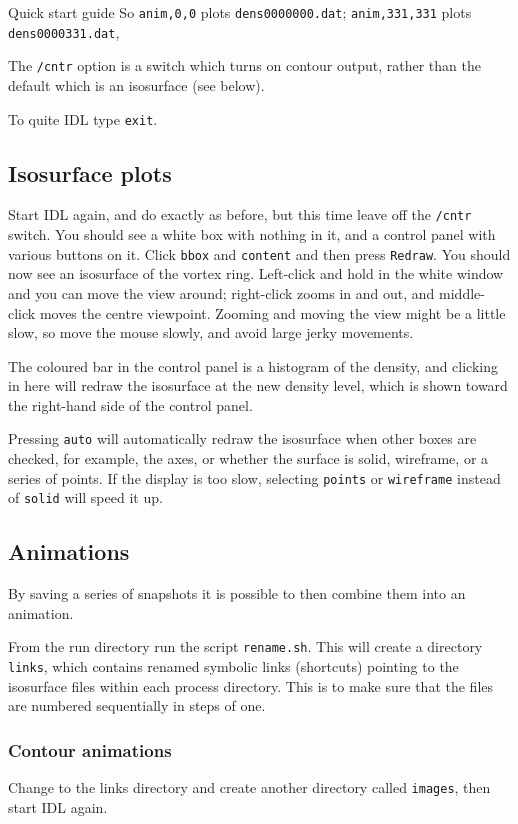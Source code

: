 \begin{chapter}{\label{cha:quickstart} Quick start guide}
  So \verb"anim,0,0" plots \verb"dens0000000.dat"; \verb"anim,331,331" plots
  \verb"dens0000331.dat", \etc

  The \verb"/cntr" option is a switch which turns on contour output, rather
  than the default which is an isosurface (see below).

  To quite IDL type \verb"exit".

  \subsection{Isosurface plots}
  Start IDL again, and do exactly as before, but this time leave off the
  \verb"/cntr" switch.  You should see a white box with nothing in it, and a
  control panel with various buttons on it.  Click \verb"bbox" and
  \verb"content" and then press \verb"Redraw".  You should now see an
  isosurface of the vortex ring.  Left-click and hold in the white window and
  you can move the view around; right-click zooms in and out, and middle-click
  moves the centre viewpoint.  Zooming and moving the view might be a little
  slow, so move the mouse slowly, and avoid large jerky movements.

  The coloured bar in the control panel is a histogram of the density, and
  clicking in here will redraw the isosurface at the new density level, which
  is shown toward the right-hand side of the control panel.

  Pressing \verb"auto" will automatically redraw the isosurface when other
  boxes are checked, for example, the axes, or whether the surface is solid,
  wireframe, or a series of points.  If the display is too slow, selecting
  \verb"points" or \verb"wireframe" instead of \verb"solid" will speed it up.

  \subsection{Animations}
  By saving a series of snapshots it is possible to then combine them into an
  animation.

  From the run directory run the script \verb"rename.sh".  This will create a
  directory \verb"links", which contains renamed symbolic links (shortcuts)
  pointing to the isosurface files within each process directory.  This is to
  make sure that the files are numbered sequentially in steps of one.

  \subsubsection{Contour animations}
  Change to the links directory and create another directory called
  \verb"images", then start IDL again.


\end{chapter}
